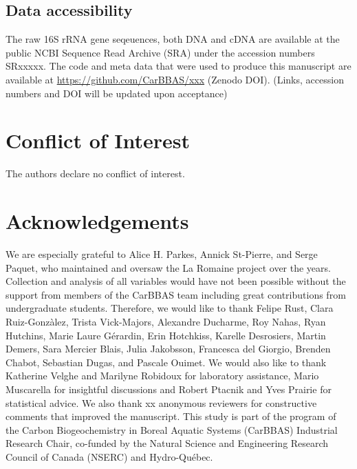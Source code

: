 \documentclass[12pt,a4paper]{article} %
\begin{document}

\subsection*{Data accessibility}
The raw 16S rRNA gene seqeuences, both DNA and cDNA are available at the public NCBI Sequence Read Archive (SRA) under the accession numbers SRxxxxx. The code and meta data that were used to produce this manuscript are available at \url{https://github.com/CarBBAS/xxx} (Zenodo DOI). (Links, accession numbers and DOI will be updated upon acceptance) \\

\section*{Conflict of Interest}
The authors declare no conflict of interest.

\section*{Acknowledgements}
We are especially grateful to Alice H. Parkes, Annick St-Pierre, and Serge Paquet, who maintained and oversaw the La Romaine project over the years. Collection and analysis of all variables would have not been possible without the support from members of the CarBBAS team including great contributions from undergraduate students. Therefore, we would like to thank Felipe Rust, Clara Ruiz-Gonz\`{a}lez, Trista Vick-Majors, Alexandre Ducharme, Roy Nahas, Ryan Hutchins, Marie Laure G\'{e}rardin,  Erin Hotchkiss, Karelle Desrosiers, Martin Demers, Sara Mercier Blais, Julia Jakobsson, Francesca del Giorgio, Brenden Chabot, Sebastian Dugas, and Pascale Ouimet. We would also like to thank Katherine Velghe and Marilyne Robidoux for laboratory assistance, Mario Muscarella for insightful discussions and Robert Ptacnik and Yves Prairie for statistical advice. We also thank xx anonymous reviewers for constructive comments that improved the manuscript. This study is part of the program of the Carbon Biogeochemistry in Boreal Aquatic Systems (CarBBAS) Industrial Research Chair, co-funded by the Natural Science and Engineering Research Council of Canada (NSERC) and Hydro-Qu\'{e}bec.
\end{document}
